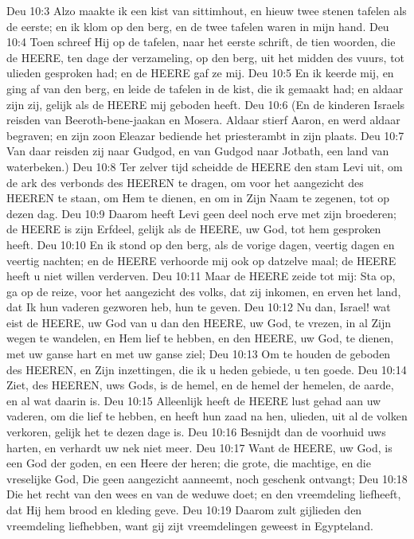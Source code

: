 Deu 10:3  Alzo maakte ik een kist van sittimhout, en hieuw twee stenen tafelen als de eerste; en ik klom op den berg, en de twee tafelen waren in mijn hand.
Deu 10:4  Toen schreef Hij op de tafelen, naar het eerste schrift, de tien woorden, die de HEERE, ten dage der verzameling, op den berg, uit het midden des vuurs, tot ulieden gesproken had; en de HEERE gaf ze mij.
Deu 10:5  En ik keerde mij, en ging af van den berg, en leide de tafelen in de kist, die ik gemaakt had; en aldaar zijn zij, gelijk als de HEERE mij geboden heeft.
Deu 10:6  (En de kinderen Israels reisden van Beeroth-bene-jaakan en Mosera. Aldaar stierf Aaron, en werd aldaar begraven; en zijn zoon Eleazar bediende het priesterambt in zijn plaats.
Deu 10:7  Van daar reisden zij naar Gudgod, en van Gudgod naar Jotbath, een land van waterbeken.)
Deu 10:8  Ter zelver tijd scheidde de HEERE den stam Levi uit, om de ark des verbonds des HEEREN te dragen, om voor het aangezicht des HEEREN te staan, om Hem te dienen, en om in Zijn Naam te zegenen, tot op dezen dag.
Deu 10:9  Daarom heeft Levi geen deel noch erve met zijn broederen; de HEERE is zijn Erfdeel, gelijk als de HEERE, uw God, tot hem gesproken heeft.
Deu 10:10  En ik stond op den berg, als de vorige dagen, veertig dagen en veertig nachten; en de HEERE verhoorde mij ook op datzelve maal; de HEERE heeft u niet willen verderven.
Deu 10:11  Maar de HEERE zeide tot mij: Sta op, ga op de reize, voor het aangezicht des volks, dat zij inkomen, en erven het land, dat Ik hun vaderen gezworen heb, hun te geven.
Deu 10:12  Nu dan, Israel! wat eist de HEERE, uw God van u dan den HEERE, uw God, te vrezen, in al Zijn wegen te wandelen, en Hem lief te hebben, en den HEERE, uw God, te dienen, met uw ganse hart en met uw ganse ziel;
Deu 10:13  Om te houden de geboden des HEEREN, en Zijn inzettingen, die ik u heden gebiede, u ten goede.
Deu 10:14  Ziet, des HEEREN, uws Gods, is de hemel, en de hemel der hemelen, de aarde, en al wat daarin is.
Deu 10:15  Alleenlijk heeft de HEERE lust gehad aan uw vaderen, om die lief te hebben, en heeft hun zaad na hen, ulieden, uit al de volken verkoren, gelijk het te dezen dage is.
Deu 10:16  Besnijdt dan de voorhuid uws harten, en verhardt uw nek niet meer.
Deu 10:17  Want de HEERE, uw God, is een God der goden, en een Heere der heren; die grote, die machtige, en die vreselijke God, Die geen aangezicht aanneemt, noch geschenk ontvangt;
Deu 10:18  Die het recht van den wees en van de weduwe doet; en den vreemdeling liefheeft, dat Hij hem brood en kleding geve.
Deu 10:19  Daarom zult gijlieden den vreemdeling liefhebben, want gij zijt vreemdelingen geweest in Egypteland.
